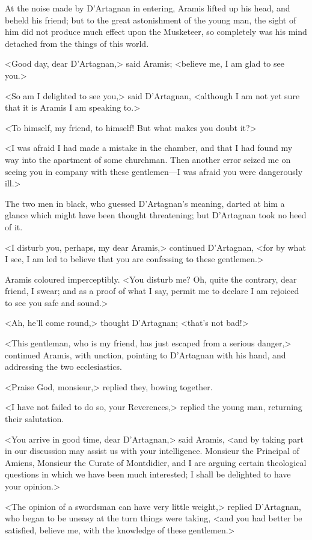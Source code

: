 At the noise made by D'Artagnan in entering, Aramis lifted up his head, and beheld his friend; but to the great astonishment of the young man, the sight of him did not produce much effect upon the Musketeer, so completely was his mind detached from the things of this world. 

<Good day, dear D'Artagnan,> said Aramis; <believe me, I am glad to see you.> 

<So am I delighted to see you,> said D'Artagnan, <although I am not yet sure that it is Aramis I am speaking to.> 

<To himself, my friend, to himself! But what makes you doubt it?> 

<I was afraid I had made a mistake in the chamber, and that I had found my way into the apartment of some churchman. Then another error seized me on seeing you in company with these gentlemen—I was afraid you were dangerously ill.> 

The two men in black, who guessed D'Artagnan's meaning, darted at him a glance which might have been thought threatening; but D'Artagnan took no heed of it. 

<I disturb you, perhaps, my dear Aramis,> continued D'Artagnan, <for by what I see, I am led to believe that you are confessing to these gentlemen.> 

Aramis coloured imperceptibly. <You disturb me? Oh, quite the contrary, dear friend, I swear; and as a proof of what I say, permit me to declare I am rejoiced to see you safe and sound.> 

<Ah, he'll come round,> thought D'Artagnan; <that's not bad!> 

<This gentleman, who is my friend, has just escaped from a serious danger,> continued Aramis, with unction, pointing to D'Artagnan with his hand, and addressing the two ecclesiastics. 

<Praise God, monsieur,> replied they, bowing together. 

<I have not failed to do so, your Reverences,> replied the young man, returning their salutation. 

<You arrive in good time, dear D'Artagnan,> said Aramis, <and by taking part in our discussion may assist us with your intelligence. Monsieur the Principal of Amiens, Monsieur the Curate of Montdidier, and I are arguing certain theological questions in which we have been much interested; I shall be delighted to have your opinion.> 

<The opinion of a swordsman can have very little weight,> replied D'Artagnan, who began to be uneasy at the turn things were taking, <and you had better be satisfied, believe me, with the knowledge of these gentlemen.> 

